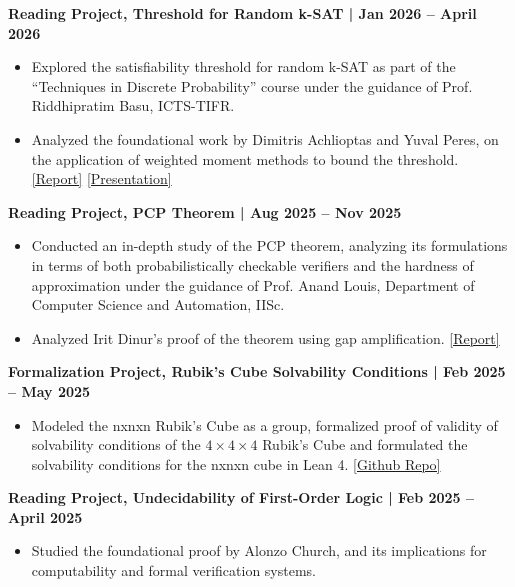 \documentclass[a4paper,10pt]{article}
\begin{document}
\noindent \textbf{Reading Project, Threshold for Random k-SAT | Jan 2026 -- April 2026}
\begin{itemize}
    \item Explored the satisfiability threshold for random k-SAT as part of the ``Techniques in Discrete Probability'' course under the guidance of Prof. Riddhipratim Basu, ICTS-TIFR.
    \item Analyzed the foundational work by Dimitris Achlioptas and Yuval Peres, on the application of weighted moment methods to bound the threshold. \href{https://omar826.github.io/report_ksat.pdf}{[Report]} \href{https://omar826.github.io/presentation_ksat.pdf}{[Presentation]}
\end{itemize}

\vspace{3pt}
\noindent \textbf{Reading Project, PCP Theorem | Aug 2025 -- Nov 2025}
\begin{itemize}
    \item Conducted an in-depth study of the PCP theorem, analyzing its formulations in terms of both probabilistically checkable verifiers and the hardness of approximation under the guidance of Prof. Anand Louis, Department of Computer Science and Automation, IISc.
    \item Analyzed Irit Dinur's proof of the theorem using gap amplification. \href{https://omar826.github.io/PCP_report.pdf}{[Report]}
\end{itemize}

\vspace{3pt}
\noindent \textbf{Formalization Project, Rubik's Cube Solvability Conditions | Feb 2025 -- May 2025}
\begin{itemize}
    \item Modeled the nxnxn Rubik's Cube as a group, formalized proof of validity of solvability conditions of the $4\times4\times4$ Rubik's Cube and formulated the solvability conditions for the nxnxn cube in Lean 4. \href{https://github.com/omar826/N_Rubiks_Cube}{[Github Repo]}
\end{itemize}

\vspace{3pt}
\noindent \textbf{Reading Project, Undecidability of First-Order Logic | Feb 2025 -- April 2025}
\begin{itemize}
    \item Studied the foundational proof by Alonzo Church, and its implications for computability and formal verification systems.
\end{itemize}
\end{document}
